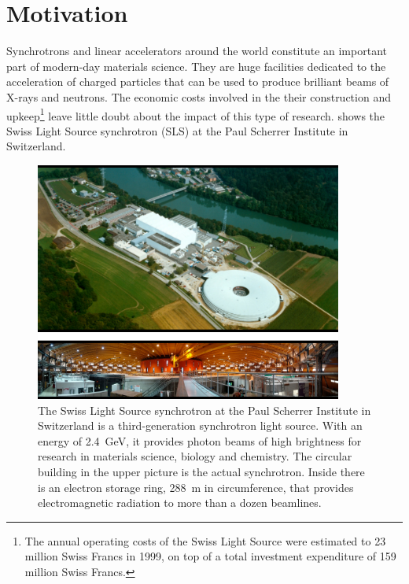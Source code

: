 \documentclass[10pt,twoside, b5paper,pdftex]{report}
\begin{document}
\section{Motivation}
Synchrotrons and linear accelerators  around the world constitute an important part of modern-day materials science. They are huge facilities dedicated to the acceleration of charged particles that can be used to produce brilliant beams of X-rays and neutrons. The economic costs involved in the their construction and upkeep\footnote{The annual operating costs of the Swiss Light Source were estimated to 23 million Swiss Francs in 1999, on top of a total investment expenditure of 159 million Swiss Francs.} leave little doubt about the impact of this type of research.  shows the Swiss Light Source synchrotron (SLS) at the Paul Scherrer Institute in Switzerland.%
\begin{figure}[htbp]
	\begin{center}
		\includegraphics[width=0.9\textwidth]{figures/sync.pdf}		
	\end{center}
	\caption{The Swiss Light Source synchrotron at the Paul Scherrer Institute in Switzerland is a third-generation synchrotron light source. With an energy of \SI{2.4}{\giga\electronvolt}, it provides photon beams of high brightness for research in materials science, biology and chemistry. The circular building in the upper picture is the actual synchrotron. Inside there is an electron storage ring, \SI{288}{\meter} in circumference, that provides electromagnetic radiation to more than a dozen beamlines. \label{fig:sync}}
\end{figure}
\end{document}
